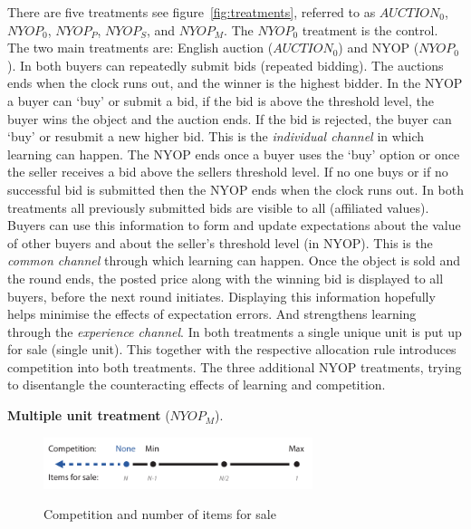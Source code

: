 \documentclass[a4paper,12pt]{article}
\begin{document}
	There are five treatments see figure~\ref{fig:treatments}, referred to as $AUCTION_0$, $NYOP_0$, $NYOP_P$, $NYOP_S$, and $NYOP_M$. The $NYOP_0$ treatment is the control. The two main treatments are: English auction ($AUCTION_0$) and NYOP ($NYOP_0$).
	In both buyers can repeatedly submit bids (repeated bidding). The auctions ends when the clock runs out, and the winner is the highest bidder. In the NYOP a buyer can `buy' or submit a bid, if the bid is above the threshold level, the buyer wins the object and the auction ends. If the bid is rejected, the buyer can `buy' or resubmit a new higher bid. This is the \emph{individual channel} in which learning can happen. The NYOP ends once a buyer uses the `buy' option or once the seller receives a bid above the sellers threshold level. If no one buys or if no successful bid is submitted then the NYOP ends when the clock runs out. In both treatments all previously submitted bids are visible to all (affiliated values). Buyers can use this information to form and update expectations about the value of other buyers and about the seller's threshold level (in NYOP). This is the \emph{common channel} through which learning can happen. Once the object is sold and the round ends, the posted price along with the winning bid is displayed to all buyers, before the next round initiates. Displaying this information hopefully helps minimise the effects of expectation errors. And strengthens learning through the \emph{experience channel}. In both treatments a single unique unit is put up for sale (single unit). This together with the respective allocation rule introduces competition into both treatments. The three additional NYOP treatments, trying to disentangle the counteracting effects of learning and competition.

	{\bf Multiple unit treatment} ($NYOP_M$). 
	
	\begin{figure}
	        \centering
	        \caption{Competition and number of items for sale}
	        \includegraphics[width=0.7\textwidth]{Figures/Competition-Items}
			\label{fig:competition-items}
	\end{figure}
	
\end{document}
